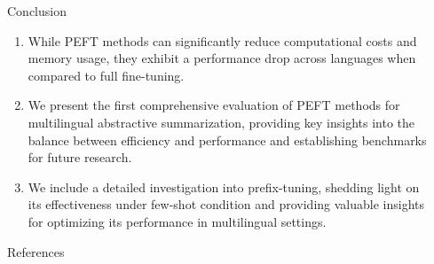 \documentclass[final]{beamer}
\newlength{\sepwidth}
\newlength{\colwidth}
\newcommand{\separatorcolumn}{\begin{column}{\sepwidth}\end{column}}
\begin{document}
\begin{frame}[t]
\begin{columns}[t]
\begin{column}{\colwidth}
  \begin{exampleblock}{Conclusion}
    \begin{enumerate}
      \item While PEFT methods can significantly reduce computational costs and memory usage, they exhibit a performance drop across languages when compared to full fine-tuning.
      \item We present the first comprehensive evaluation of PEFT methods for multilingual abstractive summarization, providing key insights into the balance between efficiency and performance and establishing benchmarks for future research.
      \item We include a detailed investigation into prefix-tuning, shedding light on its effectiveness under few-shot condition and providing valuable insights for optimizing its performance in multilingual settings.
    \end{enumerate}
  \end{exampleblock}

  \begin{block}{References}
    \nocite{*}
    \footnotesize{}
  \end{block}

\end{column}
\separatorcolumn




\end{columns}
\end{frame}
\end{document}
